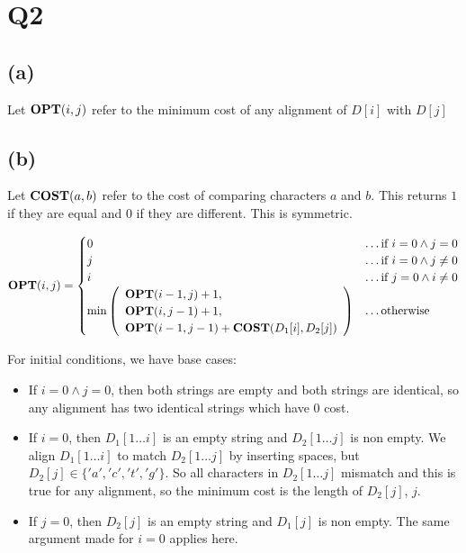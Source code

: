 \section*{Q2}

\subsection*{(a)}
Let $\textbf{OPT}(i,j)$ refer to the minimum cost of any alignment of $D[i]$ with $D[j]$

\subsection*{(b)}

Let $\textbf{COST}(a, b)$ refer to the cost of comparing characters $a$ and $b$. This returns $1$ if they are equal and $0$ if they are different. This is symmetric.

\begin{equation}
    \begin{split}
        \textbf{OPT}(i, j) = \begin{cases}
            0 & \dots \text{if } i = 0 \wedge j = 0 \\
            j & \dots \text{if } i = 0 \wedge j \neq 0\\
            i & \dots \text{if } j = 0 \wedge i \neq 0 \\
            \min\left(
            \begin{array}{l}
                \textbf{OPT}(i-1,j) + 1, \\
                \textbf{OPT}(i,j-1) + 1, \\
                \textbf{OPT}(i-1,j-1) + \textbf{COST}(D_1[i], D_2[j])
            \end{array}
            \right) & \dots \text{otherwise}
        \end{cases}
    \end{split}
\end{equation}

For initial conditions, we have base cases:
\begin{itemize}
    \item If $i = 0 \wedge j = 0$, then both strings are empty and both strings are identical, so any alignment has two identical strings which have 0 cost.
    \item If $i=0$, then $D_1[1 \dots i]$ is an empty string and $D_2[1 \dots j]$ is non empty. We align $D_1[1 \dots i]$ to match $D_2[1 \dots j]$ by inserting spaces, but $D_2[j] \in \{'a', 'c', 't', 'g'\}$. So all characters in $D_2[1 \dots j]$ mismatch and this is true for any alignment, so the minimum cost is the length of $D_2[j]$, $j$.
    \item If $j=0$, then $D_2[j]$ is an empty string and $D_1[j]$ is non empty. The same argument made for $i=0$ applies here.
\end{itemize}

